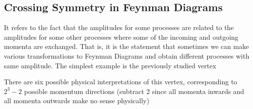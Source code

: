\documentclass[11pt, notitlepage]{report}
\numberwithin{equation}{section}
\begin{document}
    \subsection{Crossing Symmetry in Feynman Diagrams}
    It refers to the fact that the amplitudes for some processes are related to the amplitudes for some other processes where some of the incoming and outgoing momenta are exchanged. That is, it is the statement that sometimes we can make various transformations to Feynman Diagrams and obtain different processes with same amplitude. The simplest example is the previously studied vertex 
    \begin{figure}[h]
        \centering
    \end{figure}
    There are six possible physical interpretations of this vertex, corresponding to \(2^3 - 2\) possible momentum directions (subtract 2 since all momenta inwards and all momenta outwards make no sense physically)
\end{document}
